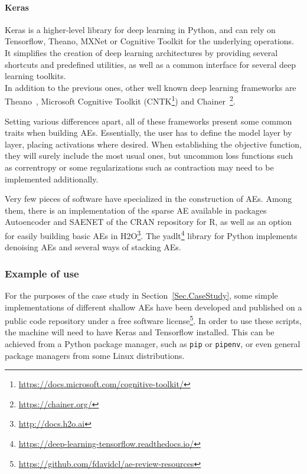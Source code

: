 \paragraph{Keras \cite{Keras}} Keras is a higher-level library for deep learning in Python, and can rely on Tensorflow, Theano, MXNet or Cognitive Toolkit for the underlying operations. It simplifies the creation of deep learning architectures by providing several shortcuts and predefined utilities, as well as a common interface for several deep learning toolkits.\\

In addition to the previous ones, other well known deep learning frameworks are Theano~\cite{Theano}, Microsoft Cognitive Toolkit (CNTK\footnote{\url{https://docs.microsoft.com/cognitive-toolkit/}}) and Chainer~\footnote{\url{https://chainer.org/}}.

Setting various differences apart, all of these frameworks present some common traits when building AEs. Essentially, the user has to define the model layer by layer, placing activations where desired. When establishing the objective function, they will surely include the most usual ones, but uncommon loss functions such as correntropy or some regularizations such as contraction may need to be implemented additionally.

Very few pieces of software have specialized in the construction of AEs. Among them, there is an implementation of the sparse AE available in packages Autoencoder \cite{CRANautoencoder} and SAENET \cite{SAENET} of the CRAN repository for R, as well as an option for easily building basic AEs in H2O\footnote{\url{http://docs.h2o.ai}}. The yadlt\footnote{\url{https://deep-learning-tensorflow.readthedocs.io/}} library for Python implements denoising AEs and several ways of stacking AEs.

\subsubsection{Example of use}

For the purposes of the case study in Section~\ref{Sec.CaseStudy}, some simple implementations of different shallow AEs have been developed and published on a public code repository under a free software license\footnote{\url{https://github.com/fdavidcl/ae-review-resources}}. In order to use these scripts, the machine will need to have Keras and Tensorflow installed. This can be achieved from a Python package manager, such as \texttt{pip} or \texttt{pipenv}, or even general package managers from some Linux distributions.

